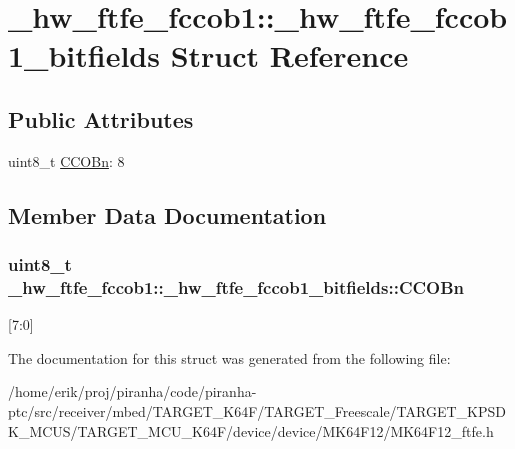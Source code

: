 \hypertarget{struct__hw__ftfe__fccob1_1_1__hw__ftfe__fccob1__bitfields}{}\section{\+\_\+hw\+\_\+ftfe\+\_\+fccob1\+:\+:\+\_\+hw\+\_\+ftfe\+\_\+fccob1\+\_\+bitfields Struct Reference}
\label{struct__hw__ftfe__fccob1_1_1__hw__ftfe__fccob1__bitfields}
\subsection*{Public Attributes}
\begin{DoxyCompactItemize}
\item 
uint8\+\_\+t \hyperlink{struct__hw__ftfe__fccob1_1_1__hw__ftfe__fccob1__bitfields_a1e48488f0f18f59c1a428c48e4d8a35a}{C\+C\+O\+Bn}\+: 8
\end{DoxyCompactItemize}


\subsection{Member Data Documentation}
\subsubsection[{\texorpdfstring{C\+C\+O\+Bn}{CCOBn}}]{\setlength{\rightskip}{0pt plus 5cm}uint8\+\_\+t \+\_\+hw\+\_\+ftfe\+\_\+fccob1\+::\+\_\+hw\+\_\+ftfe\+\_\+fccob1\+\_\+bitfields\+::\+C\+C\+O\+Bn}\hypertarget{struct__hw__ftfe__fccob1_1_1__hw__ftfe__fccob1__bitfields_a1e48488f0f18f59c1a428c48e4d8a35a}{}\label{struct__hw__ftfe__fccob1_1_1__hw__ftfe__fccob1__bitfields_a1e48488f0f18f59c1a428c48e4d8a35a}
\mbox{[}7\+:0\mbox{]} 

The documentation for this struct was generated from the following file\+:\begin{DoxyCompactItemize}
\item 
/home/erik/proj/piranha/code/piranha-\/ptc/src/receiver/mbed/\+T\+A\+R\+G\+E\+T\+\_\+\+K64\+F/\+T\+A\+R\+G\+E\+T\+\_\+\+Freescale/\+T\+A\+R\+G\+E\+T\+\_\+\+K\+P\+S\+D\+K\+\_\+\+M\+C\+U\+S/\+T\+A\+R\+G\+E\+T\+\_\+\+M\+C\+U\+\_\+\+K64\+F/device/device/\+M\+K64\+F12/M\+K64\+F12\+\_\+ftfe.\+h\end{DoxyCompactItemize}
